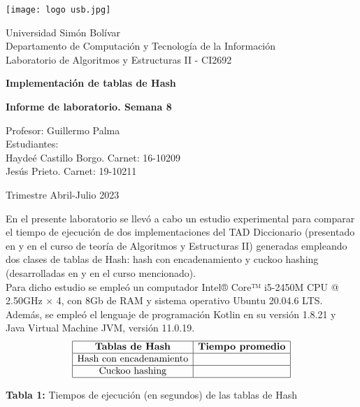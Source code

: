 \documentclass[titlepage]{article}
\begin{document}
	\begin{titlepage}
		\centering
		\texttt{[image: logo usb.jpg]}
		
		\vspace{0.5cm}		
		
		\large 
		Universidad Sim\'on Bol\'ivar\\
		Departamento de Computaci\'on y Tecnolog\'ia de la Informaci\'on\\
		Laboratorio de Algoritmos y Estructuras II - CI2692
		
		\vspace{7cm}
		
		\LARGE
		\textbf{Implementaci\'on de tablas de Hash}
		
		\vspace{0.5cm}
		
		\textbf{Informe de laboratorio. Semana 8}
		
		\vspace{5cm}
		
		\large
		
		Profesor: Guillermo Palma\\
		Estudiantes:\\
		Hayde\'e Castillo Borgo. Carnet: 16-10209\\
		Jes\'us Prieto. Carnet: 19-10211
		
		\vspace{5cm}
		
		Trimestre Abril-Julio 2023
	\end{titlepage}
	
	En el presente laboratorio se llev\'o a cabo un estudio experimental para comparar el tiempo de ejecuci\'on de dos implementaciones del TAD Diccionario (presentado en \cite{1} y en el curso de teor\'ia de Algoritmos y Estructuras II) generadas empleando dos clases de tablas de Hash: hash con encadenamiento y cuckoo hashing (desarrolladas en \cite{2} y en el curso mencionado).\\
	
	Para dicho estudio se emple\'o un computador Intel® Core™ i5-2450M CPU @ 2.50GHz × 4, con 8Gb de RAM y sistema operativo Ubuntu 20.04.6 LTS. Adem\'as, se emple\'o el lenguaje de programaci\'on Kotlin en su versi\'on 1.8.21 y Java Virtual Machine JVM, versi\'on 11.0.19.\\

	$$\begin{array}{|c|c|}
		\hline
		\textbf{Tablas de Hash} & \textbf{Tiempo promedio}\\
		\hline
		\text{Hash con encadenamiento} & \\
		\hline
		\text{Cuckoo hashing} & \\
		\hline
	\end{array}$$\:
	\begin{center}
		\textbf{Tabla 1:} Tiempos de ejecuci\'on (en segundos) de las tablas de Hash
	\end{center}\:
	
\end{document}
